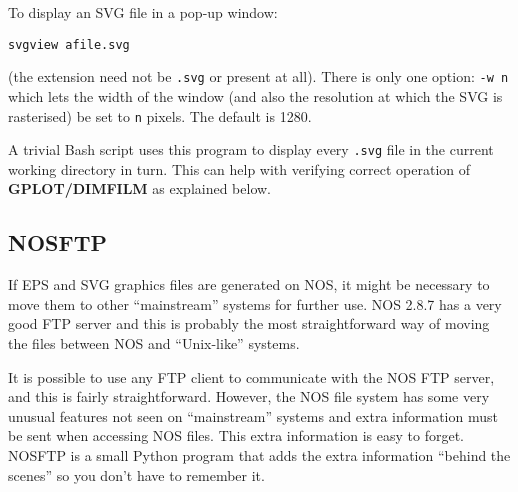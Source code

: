 \documentclass[a4paper,twoside,11pt]{article}
\newcommand{\newpara}{\par\vspace{4mm}\noindent}
\newcommand{\textttc}[1]{\texttt{\textcolor{OurRed}{#1}}}
\begin{document}
\newpara
To display an SVG file in a pop-up window:
\begin{lstlisting}
svgview afile.svg
\end{lstlisting}
(the extension need not be \texttt{.svg} or present at all). There is only one
option: \textttc{-w n} which lets the width of the window (and also the resolution at which
the SVG is rasterised) be set to \textttc{n} pixels. The default is 1280.

\newpara
A trivial Bash script uses this program to display every \texttt{.svg} file in the current working
directory in turn. This can help with verifying correct operation of \textbf{GPLOT/DIMFILM} as
explained below.

\subsection{NOSFTP}
\newpara
If EPS and SVG graphics files are generated on NOS, it might be necessary to move them to other
``mainstream'' systems for further use. NOS 2.8.7 has a very good FTP server and this is probably
the most straightforward way of moving the files between NOS and ``Unix-like'' systems.

\newpara
It is possible to use any FTP client to communicate with the NOS FTP server, and this is
fairly straightforward. However, the NOS file system has some very unusual features not seen
on ``mainstream'' systems and extra information must be sent when accessing NOS files. This
extra information is easy to forget. NOSFTP is a small Python program that adds the extra
information ``behind the scenes'' so you don't have to remember it.
\end{document}

